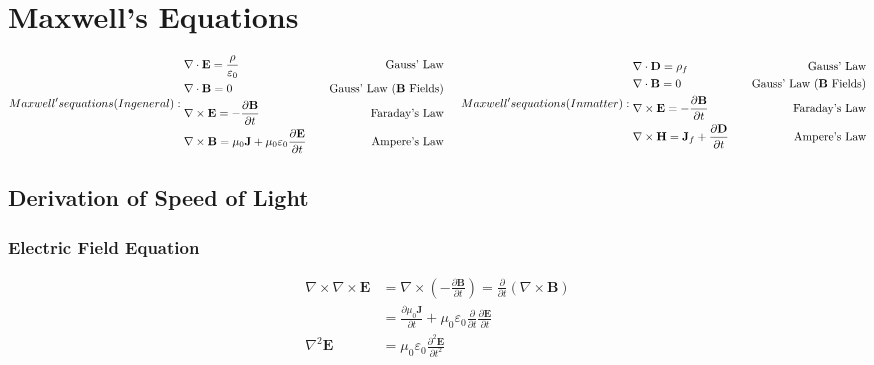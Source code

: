 \documentclass[openany]{book}
\begin{document}
\section{Maxwell's Equations}
\begin{subequations}
Maxwell's equations (In general):
\begin{align}
	&\nabla \cdot \mathbf{E}=\frac{\rho}{\varepsilon_0}\quad &\textrm{Gauss' Law} \\
            &\nabla \cdot \mathbf{B}= 0\quad &\textrm{Gauss' Law ($\mathbf{B}$ Fields)}\\
          &\nabla \times \mathbf{E}=-\frac{\partial \mathbf{B}}{\partial t}\quad &\textrm{Faraday's Law}\\
          &\nabla \times \mathbf{B}=\mu_0 \mathbf{J} + \mu_0\varepsilon_0\frac{\partial \mathbf{E}}{\partial t}\quad &\textrm{Ampere's Law} 
\end{align}

\indent Maxwell's equations (In matter):
\begin{align}
	&\nabla \cdot \mathbf{D}=\rho _f\quad &\textrm{Gauss' Law} \\
            &\nabla \cdot \mathbf{B}= 0\quad &\textrm{Gauss' Law ($\mathbf{B}$ Fields)}\\
          &\nabla \times \mathbf{E}=-\frac{\partial \mathbf{B}}{\partial t}\quad &\textrm{Faraday's Law}\\
          &\nabla \times \mathbf{H}=\mathbf{J}_f+\frac{\partial \mathbf{D}}{\partial t}\quad &\textrm{Ampere's Law} 
\end{align}
\end{subequations}
\subsection{Derivation of Speed of Light}
\subsubsection{Electric Field Equation}
\begin{align*}
\nabla \times \nabla \times \mathbf{E}&=\nabla \times \left(-\frac{\partial \mathbf{B}}{\partial t}\right)=\frac{\partial }{\partial t}\left(\nabla \times \mathbf{B}\right)\\
&=\frac{\partial \mu_0 \mathbf{J}}{\partial t}+\mu_0 \varepsilon_0\frac{\partial }{\partial t}\frac{\partial \mathbf{E}}{\partial t}\\
\nabla ^2\mathbf{E}&=\mu_0 \varepsilon_0\frac{\partial ^2 \mathbf{E}}{\partial t^2}
\end{align*}
\end{document}
